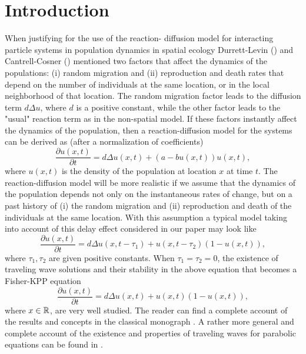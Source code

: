 \documentclass[12pt,letterpaper]{amsart}
\theoremstyle{definition}
\theoremstyle{remark}
\numberwithin{equation}{section}
\begin{document}
\section{Introduction}

When justifying for the use of the reaction- diffusion model for interacting particle systems in population dynamics in spatial ecology  Durrett-Levin (\cite{durlev}) and Cantrell-Cosner (\cite[p. 25]{cancos}) mentioned two factors that affect the dynamics of the populations: (i) random migration and (ii) reproduction and death rates that depend on the number of individuals at the same location, or in the local neighborhood of that location. The random migration factor leads to the diffusion term $d\Delta u$, where $d$ is a positive constant, while the other factor leads to the "usual" reaction term as in the non-spatial model. If these factors instantly affect the dynamics of the population, then a reaction-diffusion model for the systems can be derived as (after a normalization of coefficients)
$$
\frac{\partial u(x,t)}{\partial t} =d\Delta u(x,t)+(a-bu(x,t))u(x,t),
$$
where $u(x,t)$ is the density of the population at location $x$ at time $t$. The reaction-diffusion model will be more realistic if we assume that the dynamics of the population depends not only on the instantaneous rates of change, but on a past history of (i) the random migration and (ii)  reproduction and death of the individuals at the same location.
With this assumption a  typical model taking into account of this delay effect considered in our paper may look like
\begin{equation}\label{fkpp}
\frac{\partial u(x,t)}{\partial t} =d\Delta u(x,t-\tau_1)+u(x,t-\tau_2)(1-u(x,t)),
\end{equation}
where $\tau_1,\tau_2$ are given positive constants. When $\tau_1=\tau_2=0$, the existence of traveling wave solutions and their stability in the above equation that becomes a Fisher-KPP equation
\begin{equation*}%
\frac{\partial u(x,t)}{\partial t} =d\Delta u(x,t)+u(x,t)(1-u(x,t)),
\end{equation*}
where $x\in \mathbb R$, 
are very well studied. The reader can find a complete account of the results and concepts in the classical monograph \cite{fif}. A rather more general and complete account of the existence and properties of traveling waves for parabolic equations can be found in \cite{volvolvol}.
\end{document}
